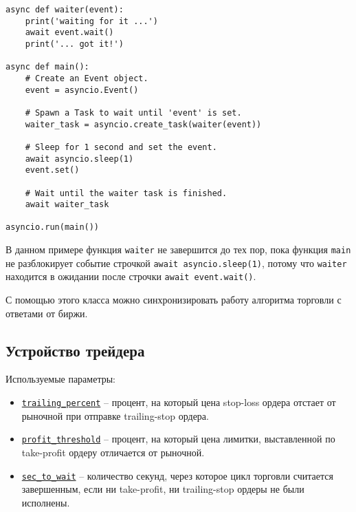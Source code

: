 \begin{verbatim}
async def waiter(event):
    print('waiting for it ...')
    await event.wait()
    print('... got it!')

async def main():
    # Create an Event object.
    event = asyncio.Event()

    # Spawn a Task to wait until 'event' is set.
    waiter_task = asyncio.create_task(waiter(event))

    # Sleep for 1 second and set the event.
    await asyncio.sleep(1)
    event.set()

    # Wait until the waiter task is finished.
    await waiter_task

asyncio.run(main())
\end{verbatim}

В данном примере функция \texttt{waiter} не завершится до тех пор, пока функция \texttt{main} не разблокирует событие строчкой \texttt{await asyncio.sleep(1)}, потому что \texttt{waiter} находится в ожидании после строчки \texttt{await event.wait()}.

С помощью этого класса можно синхронизировать работу алгоритма торговли с ответами от биржи.

\subsection{Устройство трейдера}

Используемые параметры:
\begin{itemize}
    \item \href{https://github.com/dexety/dex-trading-system/blob/ca0370d602f2dfa05262b9b8574002f965ac1502/research/ib-0002-cross-analysis/trader.py#L52}{\texttt{trailing\_percent}} -- процент, на который цена stop-loss ордера отстает от рыночной при отправке trailing-stop ордера.
    \item \href{https://github.com/dexety/dex-trading-system/blob/ca0370d602f2dfa05262b9b8574002f965ac1502/research/ib-0002-cross-analysis/trader.py#L54}{\texttt{profit\_threshold}} -- процент, на который цена лимитки, выставленной по take-profit ордеру отличается от рыночной.
    \item \href{https://github.com/dexety/dex-trading-system/blob/ca0370d602f2dfa05262b9b8574002f965ac1502/research/ib-0002-cross-analysis/trader.py#L55}{\texttt{sec\_to\_wait}} -- количество секунд, через которое цикл торговли считается завершенным, если ни take-profit, ни trailing-stop ордеры не были исполнены.
\end{itemize}

